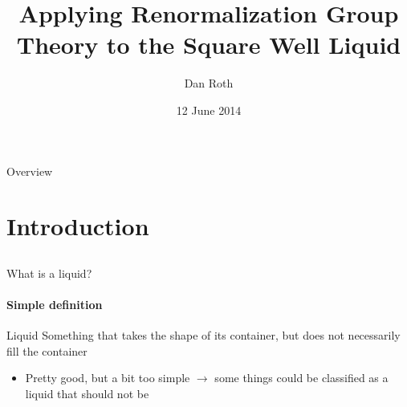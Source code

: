 \documentclass[xcolor=dvipsnames]{beamer}
\title[Applying RGT to SW liquid]{Applying Renormalization Group Theory to the Square Well Liquid}
\author[Roth \& Roundy]{Dan Roth}
\institute[OSU]{Oregon State University}
\date{12 June 2014}
\begin{document}
\begin{frame}
  \titlepage
\end{frame}

\section{}
\begin{frame}{Overview}
  \tableofcontents
\end{frame}

\section{Introduction}

\subsection{} %
\begin{frame}{What is a liquid?}
  \framesubtitle{Simple definition}
  \begin{block}{Liquid}
    Something that takes the shape of its container, but does not necessarily fill the container
  \end{block}
  \begin{itemize}
    \item Pretty good, but a bit too simple $\rightarrow$ some things could be classified as a liquid that should not be
  \end{itemize}
\end{frame}
\end{document}
